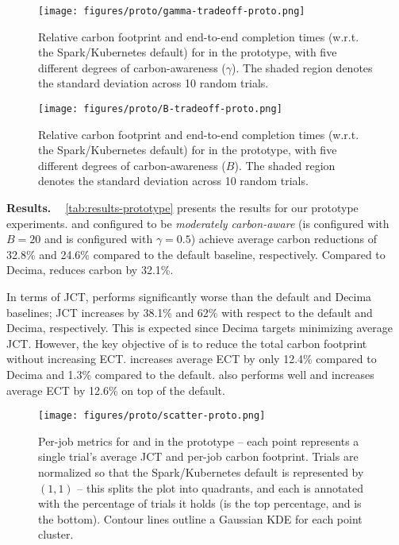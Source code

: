 \begin{figure}[t]
    \centering 
    \texttt{[image: figures/proto/gamma-tradeoff-proto.png]} \vspace{-0.4cm}
    \caption{Relative carbon footprint and end-to-end completion times (w.r.t. the Spark/Kubernetes default) for \DANISH in the prototype, with five different degrees of carbon-awareness ($\gamma$). The shaded region denotes the standard deviation across 10 random trials. }
    \label{fig:gamma-tradeoff-proto}
    \texttt{[image: figures/proto/B-tradeoff-proto.png]} 
    \vspace{-0.4cm}
    \caption{ Relative carbon footprint and end-to-end completion times (w.r.t. the Spark/Kubernetes default) for \CAP in the prototype, with five different degrees of carbon-awareness ($B$).  The shaded region denotes the standard deviation across 10 random trials. }
    \label{fig:B-tradeoff-proto} \vspace{-0.5cm}
\end{figure}





\smallskip
\noindent \textbf{Results. \ } \autoref{tab:results-prototype} presents the results for our prototype experiments.
\DANISH and \CAP configured to be \textit{moderately carbon-aware} (\CAP is configured with $B = 20$ and \DANISH is configured with $\gamma = 0.5$) achieve average carbon reductions of 32.8\% and 24.6\% compared to the default baseline, respectively.  Compared to Decima, \DANISH reduces carbon by 32.1\%.  

In terms of JCT, \DANISH performs significantly worse than the default and Decima baselines; JCT increases by 38.1\% and 62\% with respect to the default and Decima, respectively. 
This is expected since Decima targets minimizing average JCT. 
However, the key objective of \DANISH is to reduce the total carbon footprint without increasing ECT. 
\DANISH increases average ECT by only 12.4\% compared to Decima and 1.3\% compared to the default.  \CAP also performs well and increases average ECT by 12.6\% on top of the default. 





\begin{figure}[t]
    \centering 
    \texttt{[image: figures/proto/scatter-proto.png]} 
    \vspace{-0.4cm}
    \caption{ Per-job metrics for \DANISH and \CAP in the prototype -- each point represents a single trial's average JCT and per-job carbon footprint.  Trials are normalized so that the Spark/Kubernetes default is represented by $(1, 1)$ -- this splits the plot into quadrants, and each is annotated with the percentage of trials it holds (\DANISH is the top percentage, and \CAP is the bottom).  Contour lines outline a Gaussian KDE for each point cluster. %
    }
    \label{fig:scatter-proto} \vspace{-0.6cm}
\end{figure} 


